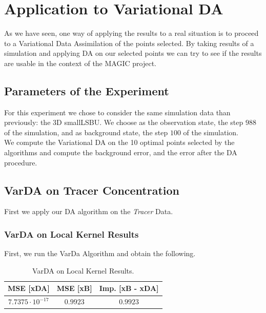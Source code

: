 



\section{Application to Variational DA}


As we have seen, one way of applying the results to a real situation is to proceed to a Variational Data Assimilation of the points selected. By taking results of a simulation and applying DA on our selected points we can try to see if the results are usable in the context of the MAGIC project. 

\subsection{Parameters of the Experiment} 

For this experiment we chose to consider the same simulation data than previously: the 3D smallLSBU.  We choose as the observation state, the step $988$ of the simulation, and as background state, the step $100$ of the simulation. \\

We compute the Variational DA on the 10 optimal points selected by the algorithms and compute the background error, and the error after the DA procedure.  
\subsection{VarDA on Tracer Concentration}

First we apply our DA algorithm on the \textit{Tracer} Data. 

\subsubsection{VarDA on Local Kernel Results}

First, we run the VarDa Algorithm and obtain the following. 
\begin{table}[h]
\centering
	\begin{tabular}{c|c|c}
	\toprule
		  MSE [xDA] & MSE [xB] &  Imp. [xB - xDA] \\ \midrule
		 $7.7375 \cdot 10^{-17}$ &  $0.9923$ & $0.9923$ \\ \bottomrule
	\end{tabular}
	\caption{VarDA on Local Kernel Results. }
\end{table}

